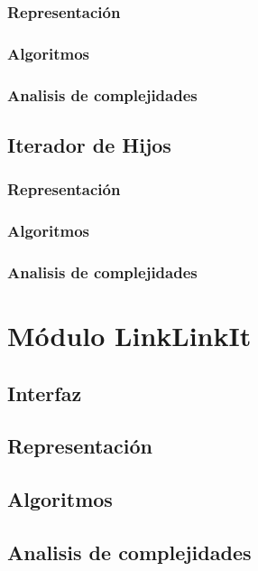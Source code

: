 \documentclass[12pt, a4paper]{article}
\begin{document}
\subsubsection{Representaci\'on}

\subsubsection{Algoritmos}

\subsubsection{Analisis de complejidades}

 
\subsection{Iterador de Hijos} 
%
\subsubsection{Representaci\'on}

\subsubsection{Algoritmos}

\subsubsection{Analisis de complejidades}

\newpage 
\section{M\'odulo LinkLinkIt} 
\subsection{Interfaz}

\subsection{Representaci\'on}

\subsection{Algoritmos}

\subsection{Analisis de complejidades}

\end{document}
